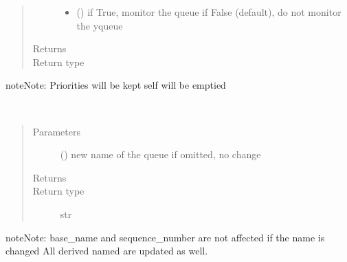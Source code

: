 \documentclass[letterpaper,10pt,english]{sphinxmanual}
\begin{document}
\begin{fulllineitems}
\begin{fulllineitems}
\begin{quote}
\begin{description}
\begin{itemize}
\item {} 
 () \textendash{} if True, monitor the queue 
if False (default), do not monitor the yqueue

\end{itemize}

\item[{Returns}] \leavevmode
{}

\item[{Return type}] \leavevmode
{\hyperref[\detokenize{Reference:salabim.Queue}]{}}

\end{description}\end{quote}

\begin{sphinxadmonition}{note}{Note:}
Priorities will be kept 
self will be emptied
\end{sphinxadmonition}

\end{fulllineitems}


\begin{fulllineitems}
\label{\detokenize{Reference:salabim.Queue.name}}~\begin{quote}\begin{description}
\item[{Parameters}] \leavevmode
{} () \textendash{} new name of the queue
if omitted, no change

\item[{Returns}] \leavevmode
{}

\item[{Return type}] \leavevmode
str

\end{description}\end{quote}

\begin{sphinxadmonition}{note}{Note:}
base\_name and sequence\_number are not affected if the name is changed 
All derived named are updated as well.
\end{sphinxadmonition}

\end{fulllineitems}


\end{fulllineitems}
\end{document}
